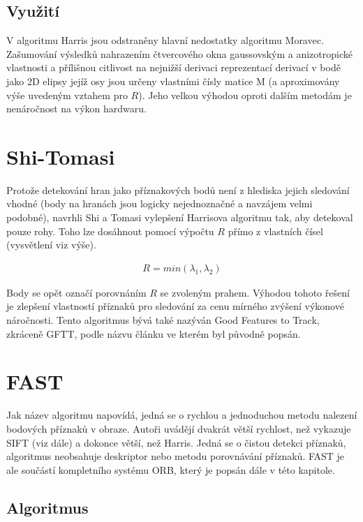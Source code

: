 \subsection{Využití}
V algoritmu Harris jsou odstraněny hlavní nedostatky algoritmu Moravec. Zašumování výsledků nahrazením čtvercového okna gaussovským a anizotropické vlastnosti a přílišnou citlivost na nejnižší derivaci reprezentací derivací v bodě jako 2D elipsy jejíž osy jsou určeny vlastními čísly matice M (a aproximovány výše uvedeným vztahem pro $R$). Jeho velkou výhodou oproti dalším metodám je nenáročnost na výkon hardwaru.

\section{Shi-Tomasi}

	Protože detekování hran jako příznakových bodů není z hlediska jejich sledování vhodné (body na hranách jsou logicky nejednoznačné a navzájem velmi podobné), navrhli Shi a Tomasi \cite{shi1994good} vylepšení Harrisova algoritmu tak, aby detekoval pouze rohy. Toho lze dosáhnout pomocí výpočtu $R$ přímo z vlastních čísel (vysvětlení viz výše). 
	
	\begin{align}
	R = min(\lambda_1, \lambda_2)
	\end{align}
	
	Body se opět označí porovnáním $R$ se zvoleným prahem. Výhodou tohoto řešení je zlepšení vlastností příznaků pro sledování za cenu mírného zvýšení výkonové náročnosti. Tento algoritmus bývá také nazýván Good Features to Track, zkráceně GFTT, podle názvu článku ve kterém byl původně popsán.

\section{FAST}

	Jak název algoritmu napovídá, jedná se o rychlou a jednoduchou metodu nalezení bodových příznaků v obraze. Autoři uvádějí dvakrát větší rychlost, než vykazuje SIFT (viz dále) a dokonce větší, než Harris. Jedná se o čistou detekci příznaků, algoritmus neobsahuje deskriptor nebo metodu porovnávání příznaků. FAST \cite{rosten2010faster} je ale součástí kompletního systému ORB, který je popsán dále v této kapitole.
	
	\subsection{Algoritmus}
	
